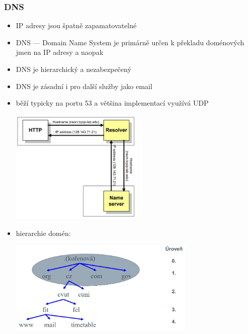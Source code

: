 \subsubsection*{DNS}
\begin{itemize}
	\item IP adresy jsou špatně zapamatovatelné
	\item DNS --- Domain Name System je primárně určen k překladu doménových jmen na IP adresy a naopak
	\item DNS je hierarchický a nezabezpečený
	\item DNS je zásadní i pro další služby jako email
	\item běží typicky na portu 53 a většina implementací využívá UDP
	
	\includegraphics[width=0.5\textwidth]{img/SP-25_4.jpg}
	
	\item hierarchie domén:
	
	\includegraphics[width=0.7\textwidth]{img/SP-25_5.jpg}
	

\end{itemize}
